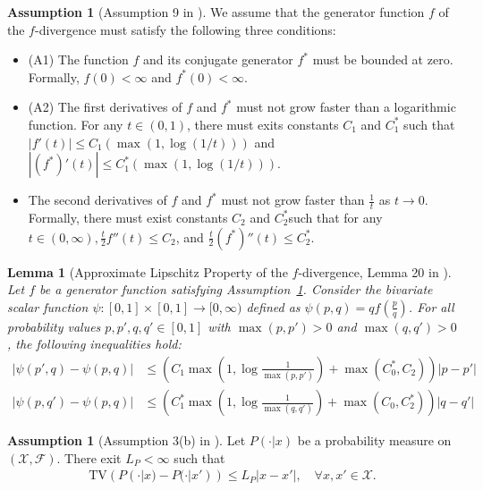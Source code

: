 \documentclass{article}
\theoremstyle{plain}
\newtheorem{lemma}[theorem]{Lemma}
\theoremstyle{definition}
\newtheorem{assumption}[theorem]{Assumption}
\theoremstyle{remark}
\begin{document}
\begin{assumption}[Assumption 9 in \cite{pillutla2023mauvescoresgenerativemodels}]\label{assump:3}
    We assume that the generator function $f$ of the $f$-divergence must satisfy the following three conditions:
    \begin{itemize}
        \item (A1) The function $f$ and its conjugate generator $f^*$ must be bounded at zero. Formally, $f(0)<\infty$ and $f^*(0)<\infty$.
        \item (A2) The first derivatives of $f$ and $f^*$ must not grow faster than a logarithmic function. For any $t\in (0,1)$, there must exits constants $C_1$ and $C_1^*$ such that $|f'(t)|\leq C_1 (\max(1,\log(1/t)))$ and $|(f^*)'(t)|\leq C_1^* (\max(1,\log(1/t)))$.
        \item The second derivatives of $f$ and $f^* 
$ must not grow faster than $\frac{1}{t}$ as $t\rightarrow 0$. Formally, there must exist  constants $C_2$ and $C_2^*$such that for any$t\in (0, \infty), \frac{t}{2}f''(t)\leq C_2$, and $\frac{t}{2}(f^*)''(t)\leq C_2^*$.
    \end{itemize}
\end{assumption}
\begin{lemma}[Approximate Lipschitz Property of the $f$-divergence, Lemma 20 in \cite{pillutla2023mauvescoresgenerativemodels}]\label{lemma:Lip}
     Let $f$ be a generator function satisfying Assumption~\ref{assump:3}. Consider the bivariate scalar function $\psi:[0,1] \times [0,1] \rightarrow [0,\infty)$ defined as $\psi(p, q)=q f(\frac{p}{q})$. For all probability values $p,p',q,q' \in [0,1]$ with $\max(p,p')>0$ and $\max(q,q')>0$, the following inequalities hold:
     \begin{align}
         |\psi(p',q)-\psi(p,q)|&\leq \left(C_1\max\left(1,\log\frac{1}{\max(p,p')}\right)+\max(C_0^*,C_2)\right)|p-p'| \\
         |\psi(p,q')-\psi(p,q)|&\leq \left(C_1^*\max\left(1,\log\frac{1}{\max(q,q')}\right)+\max(C_0,C_2^*)\right)|q-q'|
     \end{align}
\end{lemma}
\begin{assumption}[Assumption 3(b) in \cite{kara2023qlearningmdpsgeneralspaces}] \label{assumption:tx-lip}
    Let $P(\cdot|x)$ be a probability measure on $(\mathcal{X},\mathcal{F})$. There exit $L_P<\infty$ such that 
    \begin{align}
        \text{TV}(P(\cdot|x)-P(\cdot|x'))\le L_P |x-x'|, \quad \forall x,x'\in \mathcal{X}.
    \end{align}
\end{assumption}
\end{document}
